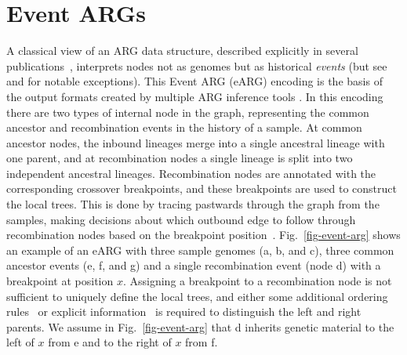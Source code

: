 \documentclass{article}
\newcommand{\noderef}[1]{\textsf{#1}}
\begin{document}
\section{Event ARGs}
\label{sec-eARG}
A classical view of an ARG data structure,
described explicitly in several publications~\citep[e.g.][]{
wiuf1999recombination,gusfield2014recombinatorics,hayman2023recoverability},
interprets nodes not as genomes but as historical \emph{events}
(but see~\citet{parida2011minimal} and \citet{zhang2023biobank}
for notable exceptions).
This Event ARG (eARG) encoding is the basis of the output formats 
created by multiple ARG inference tools
\citep[e.g.][]{song2004minimum,song2005efficient,rasmussen2014genome,
heine2018bridging,ignatieva2021kwarg}.
In this encoding there are two types of internal node in the graph,
representing the common ancestor and recombination events
in the history of a sample.
At common ancestor nodes, the inbound lineages merge into a
single ancestral lineage with one parent, and at recombination
nodes a single lineage is split into two independent
ancestral lineages. Recombination nodes are annotated with
the corresponding crossover breakpoints, and these breakpoints
are used to construct the local trees.
This is done by tracing pastwards through the graph from the samples,
making decisions about which outbound edge to follow through
recombination nodes based on the breakpoint
position~\citep{griffiths1996ancestral}. Fig.~\ref{fig-event-arg} shows an example of an
eARG with three sample genomes (\noderef{a}, \noderef{b}, and \noderef{c}),
three common ancestor events (\noderef{e}, \noderef{f}, and \noderef{g})
and a single recombination event (node \noderef{d}) with a breakpoint
at position $x$.
Assigning a breakpoint to a recombination node is
not sufficient to uniquely define the local trees, and either
some additional ordering rules~\citep[e.g.][]{griffiths1996ancestral} or
explicit information~\citep[e.g.][]{gusfield2014recombinatorics,ignatieva2021kwarg}
is required to distinguish the left and right parents.
We assume in Fig.~\ref{fig-event-arg} that \noderef{d} inherits genetic material to the
left of $x$ from \noderef{e} and to the right of $x$ from \noderef{f}.
\end{document}
